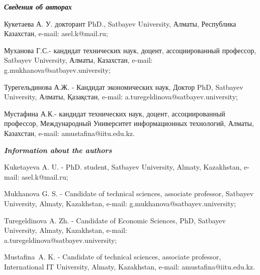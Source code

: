 \begin{authorinfo}
\hspace{1em}\emph{{\bfseries Сведения об авторах}}

Кукетаева А. У. докторант PhD., Satbayev University, Алматы, Республика
Казахстан, e-mail: asel.k@mail.ru;

Муханова Г.С.- кандидат технических наук, доцент, ассоциированный
профессор, Satbayev University, Алматы, Казахстан, e-mail:
g.mukhanova@satbayev.university;

Турегельдинова А.Ж. - Кандидат экономических наук, Доктор PhD,
Satbayev University, Алматы, Қазақстан, e-mail:
a.turegeldinova@satbayev.university;

Мустафина А.К.- кандидат технических наук, доцент, ассоциированный
профессор, Международный Университет информационных технологий, Алматы,
Казахстан, e-mail: amustafina@iitu.edu.kz.

\hspace{1em}\emph{{\bfseries Information about the authors}}

Kuketayeva A. U. - PhD. student, Satbayev University, Almaty,
Kazakhstan, e-mail: asel.k@mail.ru;

Mukhanova G. S. - Candidate of technical sciences, associate professor,
Satbayev University, Almaty, Kazakhstan, e-mail:
g.mukhanova@satbayev.university;

Turegeldinova A. Zh. - Candidate of Economic Sciences, PhD,
Satbayev University, Almaty, Kazakhstan, e-mail:\\
a.turegeldinova@satbayev.university;

Mustafina~A. K. - Candidate of technical sciences, associate
professor, International IT University, Almaty, Kazakhstan, e-mail:
amustafina@iitu.edu.kz.
\end{authorinfo}
